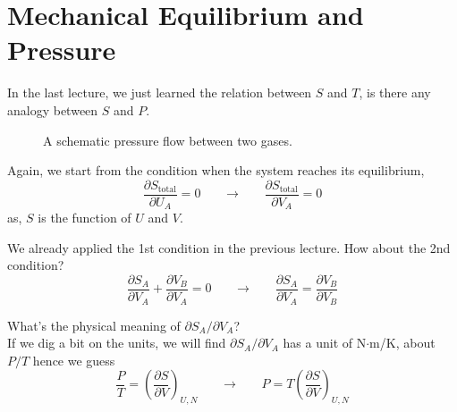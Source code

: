 


\section{Mechanical Equilibrium and Pressure}
In the last lecture, we just learned the relation between $S$ and $T$, is there any analogy between $S$ and $P$.

\begin{figure}[h]
\centering
{}
\caption{A schematic pressure flow between two gases.}
\end{figure}

Again, we start from the condition when the system reaches its equilibrium,
\begin{equation} \label{entropy} 
\frac {\partial{S_\text{total}}} {\partial{U_A}}=0     ~~~~~~~~ \rightarrow~~~~~~~~  \frac {\partial{S_\text{total}}} {\partial{V_A}}=0
\end{equation}
as, $S$ is the function of $U$ and $V$.

We already applied the 1st condition in the previous lecture. How about the 2nd condition? 
\begin{equation} \label{entropy} 
\frac {\partial{S_A}} {\partial{V_A}} +  \frac {\partial{V_B}} {\partial{V_A}} =0     ~~~~~~~~ \rightarrow~~~~~~~~  
\frac {\partial{S_A}} {\partial{V_A}} =  \frac {\partial{V_B}} {\partial{V_B}} 
\end{equation}

What's the physical meaning of $\partial{S_A}/\partial{V_A}$? \\
If we dig a bit on the units, we will find $\partial{S_A}/\partial{V_A}$ has a unit of N$\cdot$m/K, about $P/T$ hence we guess
\begin{equation} \label{entropy} 
\frac {P}{T} =  (\frac {\partial{S}} {\partial{V}})_{U,N}     ~~~~~~~~ \rightarrow~~~~~~~~  
P = T (\frac {\partial{S}} {\partial{V}})_{U,N}
\end{equation}


